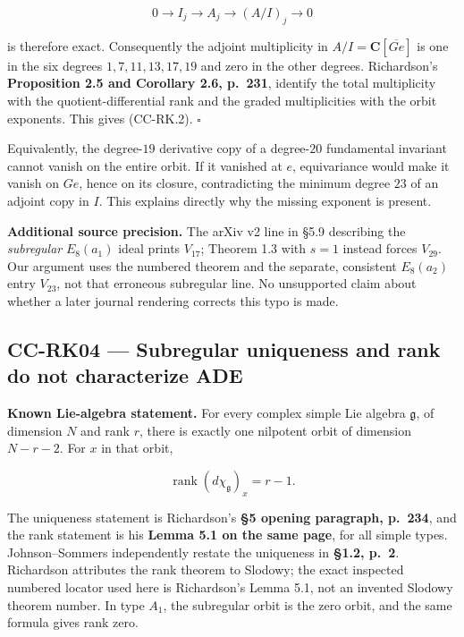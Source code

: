 \[
 0\longrightarrow I_j\longrightarrow A_j
     \longrightarrow (A/I)_j\longrightarrow0
\]

is therefore exact. Consequently the adjoint multiplicity in \(A/I=\mathbf C[\overline{G e}]\) is one in the six degrees \(1,7,11,13,17,19\) and zero in the other degrees. Richardson's \textbf{Proposition 2.5 and Corollary 2.6, p.~231}, identify the total multiplicity with the quotient-differential rank and the graded multiplicities with the orbit exponents. This gives (CC-RK.2). \(\square\)

Equivalently, the degree-\(19\) derivative copy of a degree-\(20\) fundamental invariant cannot vanish on the entire orbit. If it vanished at \(e\), equivariance would make it vanish on \(Ge\), hence on its closure, contradicting the minimum degree \(23\) of an adjoint copy in \(I\). This explains directly why the missing exponent is present.

\textbf{Additional source precision.} The arXiv v2 line in §5.9 describing the \emph{subregular} \(E_8(a_1)\) ideal prints \(V_{17}\); Theorem 1.3 with \(s=1\) instead forces \(V_{29}\). Our argument uses the numbered theorem and the separate, consistent \(E_8(a_2)\) entry \(V_{23}\), not that erroneous subregular line. No unsupported claim about whether a later journal rendering corrects this typo is made.

\subsection{CC-RK04 --- Subregular uniqueness and rank do not characterize ADE}\label{cc-rk04-subregular-uniqueness-and-rank-do-not-characterize-ade}

\textbf{Known Lie-algebra statement.} For every complex simple Lie algebra \(\mathfrak g\), of dimension \(N\) and rank \(r\), there is exactly one nilpotent orbit of dimension \(N-r-2\). For \(x\) in that orbit,

\[
 \operatorname{rank}(d\chi_{\mathfrak g})_x=r-1.
 \tag{CC-RK.3}
\]

The uniqueness statement is Richardson's \textbf{§5 opening paragraph, p.~234}, and the rank statement is his \textbf{Lemma 5.1 on the same page}, for all simple types. Johnson--Sommers independently restate the uniqueness in \textbf{§1.2, p.~2}. Richardson attributes the rank theorem to Slodowy; the exact inspected numbered locator used here is Richardson's Lemma 5.1, not an invented Slodowy theorem number. In type \(A_1\), the subregular orbit is the zero orbit, and the same formula gives rank zero.

